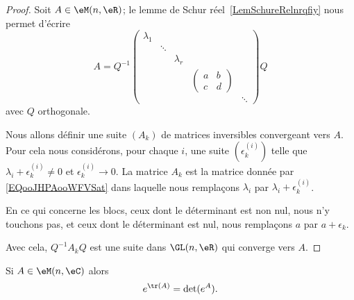 \begin{proof}
	Soit \( A\in \eM(n,\eR)\); le lemme de Schur réel~\ref{LemSchureRelnrqfiy} nous permet d'écrire
	\begin{equation}        \label{EQooJHPAooWFVSat}
		A=Q^{-1}
		\begin{pmatrix}
			\lambda_1 &        &           &                 &        \\
			          & \ddots &           &                 &        \\
			          &        & \lambda_r &                 &        \\
			          &        &           & \begin{pmatrix}
				                                 a & b \\
				                                 c & d
			                                 \end{pmatrix} &          \\
			          &        &           &                 & \ddots
		\end{pmatrix}
		Q
	\end{equation}
	avec \( Q\) orthogonale.

	Nous allons définir une suite \( (A_k)\) de matrices inversibles convergeant vers \( A\). Pour cela nous considérons, pour chaque \( i\), une suite \( (\epsilon^{(i)}_k)\) telle que \( \lambda_i+\epsilon^{(i)}_k\neq 0\) et \( \epsilon^{(i)}_k\to 0\). La matrice \( A_k\) est la matrice donnée par \eqref{EQooJHPAooWFVSat} dans laquelle nous remplaçons \( \lambda_i\) par \( \lambda_i+\epsilon^{(i)}_k\).

	En ce qui concerne les blocs, ceux dont le déterminant est non nul, nous n'y touchons pas, et ceux dont le déterminant est nul, nous remplaçons \( a\) par \( a+\epsilon_k\).

	Avec cela, \( Q^{-1}A_kQ\) est une suite dans \( \GL(n,\eR)\) qui converge vers \( A\).
\end{proof}

\begin{proposition}     \label{PROPooZUHOooQBwfZq}
	Si \( A\in\eM(n,\eC)\) alors
	\begin{equation}
		e^{\tr(A)}=\det( e^{A}).
	\end{equation}
\end{proposition}

